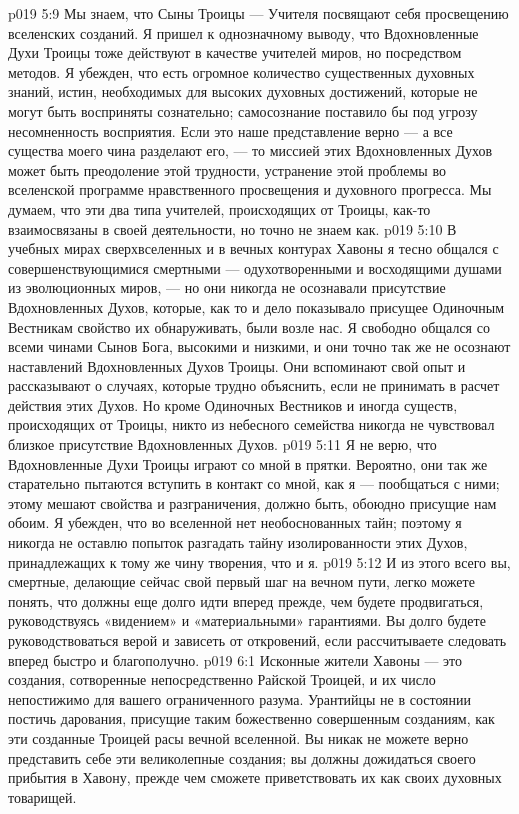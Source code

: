 \vs p019 5:9 Мы знаем, что Сыны Троицы --- Учителя посвящают себя  просвещению вселенских созданий. Я пришел к однозначному выводу, что Вдохновленные Духи Троицы тоже действуют в качестве учителей миров, но посредством  методов. Я убежден, что есть огромное количество существенных духовных знаний, истин, необходимых для высоких духовных достижений, которые не могут быть восприняты сознательно; самосознание поставило бы под угрозу несомненность восприятия. Если это наше представление верно --- а все существа моего чина разделают его, --- то миссией этих Вдохновленных Духов может быть преодоление этой трудности, устранение этой проблемы во вселенской программе нравственного просвещения и духовного прогресса. Мы думаем, что эти два типа учителей, происходящих от Троицы, как\hyp{}то взаимосвязаны в своей деятельности, но точно не знаем как.
\vs p019 5:10 В учебных мирах сверхвселенных и в вечных контурах Хавоны я тесно общался с совершенствующимися смертными --- одухотворенными и восходящими душами из эволюционных миров, --- но они никогда не осознавали присутствие Вдохновленных Духов, которые, как то и дело показывало присущее Одиночным Вестникам свойство их обнаруживать, были возле нас. Я свободно общался со всеми чинами Сынов Бога, высокими и низкими, и они точно так же не осознают наставлений Вдохновленных Духов Троицы. Они вспоминают свой опыт и рассказывают о случаях, которые трудно объяснить, если не принимать в расчет действия этих Духов. Но кроме Одиночных Вестников и иногда существ, происходящих от Троицы, никто из небесного семейства никогда не чувствовал близкое присутствие Вдохновленных Духов.
\vs p019 5:11 Я не верю, что Вдохновленные Духи Троицы играют со мной в прятки. Вероятно, они так же старательно пытаются вступить в контакт со мной, как я --- пообщаться с ними; этому мешают свойства и разграничения, должно быть, обоюдно присущие нам обоим. Я убежден, что во вселенной нет необоснованных тайн; поэтому я никогда не оставлю попыток разгадать тайну изолированности этих Духов, принадлежащих к тому же чину творения, что и я.
\vs p019 5:12 И из этого всего вы, смертные, делающие сейчас свой первый шаг на вечном пути, легко можете понять, что должны еще долго идти вперед прежде, чем будете продвигаться, руководствуясь «видением» и «материальными» гарантиями. Вы долго будете руководствоваться верой и зависеть от откровений, если рассчитываете следовать вперед быстро и благополучно.
\vs p019 6:1 Исконные жители Хавоны --- это создания, сотворенные непосредственно Райской Троицей, и их число непостижимо для вашего ограниченного разума. Урантийцы не в состоянии постичь дарования, присущие таким божественно совершенным созданиям, как эти созданные Троицей расы вечной вселенной. Вы никак не можете верно представить себе эти великолепные создания; вы должны дожидаться своего прибытия в Хавону, прежде чем сможете приветствовать их как своих духовных товарищей.
